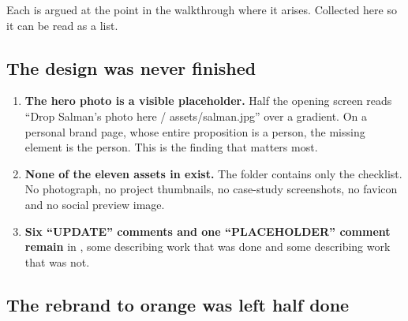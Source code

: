 \documentclass[11pt,a4paper]{article}
\begin{document}
Each is argued at the point in the walkthrough where it arises. Collected here so
it can be read as a list.

\subsection{The design was never finished}

\begin{enumerate}
\item \textbf{The hero photo is a visible placeholder.} Half the opening screen
  reads ``Drop Salman's photo here / assets/salman.jpg'' over a gradient. On a
  personal brand page, whose entire proposition is a person, the missing element is
  the person. This is the finding that matters most.
\item \textbf{None of the eleven assets in  exist.} The
   folder contains only the checklist. No photograph, no project
  thumbnails, no case-study screenshots, no favicon and no social preview image.
\item \textbf{Six ``UPDATE'' comments and one ``PLACEHOLDER'' comment remain} in
  , some describing work that was done and some describing work
  that was not.
\end{enumerate}

\subsection{The rebrand to orange was left half done}
\end{document}
